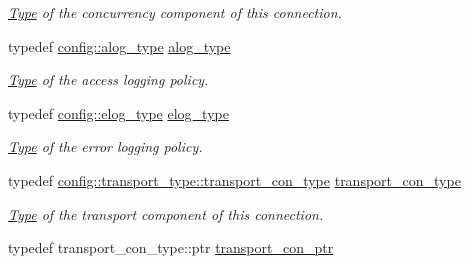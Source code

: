 \begin{DoxyCompactItemize}
\begin{DoxyCompactList}\small\item\em \mbox{\hyperlink{struct_type}{Type}} of the concurrency component of this connection. \end{DoxyCompactList}\item 
\mbox{\label{classwebsocketpp_1_1connection_a2da7d18aecf9153429bab9fcd2bab7b8}} 
typedef \mbox{\hyperlink{classwebsocketpp_1_1log_1_1stub}{config\+::alog\+\_\+type}} \mbox{\hyperlink{classwebsocketpp_1_1connection_a2da7d18aecf9153429bab9fcd2bab7b8}{alog\+\_\+type}}
\begin{DoxyCompactList}\small\item\em \mbox{\hyperlink{struct_type}{Type}} of the access logging policy. \end{DoxyCompactList}\item 
\mbox{\label{classwebsocketpp_1_1connection_a80314ab2e4ddefdd4783fb1934fedee6}} 
typedef \mbox{\hyperlink{classwebsocketpp_1_1log_1_1stub}{config\+::elog\+\_\+type}} \mbox{\hyperlink{classwebsocketpp_1_1connection_a80314ab2e4ddefdd4783fb1934fedee6}{elog\+\_\+type}}
\begin{DoxyCompactList}\small\item\em \mbox{\hyperlink{struct_type}{Type}} of the error logging policy. \end{DoxyCompactList}\item 
\mbox{\label{classwebsocketpp_1_1connection_a1deb19aef8e7bde8f955ef5f952c9d19}} 
typedef \mbox{\hyperlink{classwebsocketpp_1_1transport_1_1asio_1_1endpoint_a75f3102766fd3ba8230e99a2b0e00457}{config\+::transport\+\_\+type\+::transport\+\_\+con\+\_\+type}} \mbox{\hyperlink{classwebsocketpp_1_1connection_a1deb19aef8e7bde8f955ef5f952c9d19}{transport\+\_\+con\+\_\+type}}
\begin{DoxyCompactList}\small\item\em \mbox{\hyperlink{struct_type}{Type}} of the transport component of this connection. \end{DoxyCompactList}\item 
\mbox{\label{classwebsocketpp_1_1connection_ad2fce7d1a535820336275ae116384738}} 
typedef transport\+\_\+con\+\_\+type\+::ptr \mbox{\hyperlink{classwebsocketpp_1_1connection_ad2fce7d1a535820336275ae116384738}{transport\+\_\+con\+\_\+ptr}}

\end{DoxyCompactItemize}

